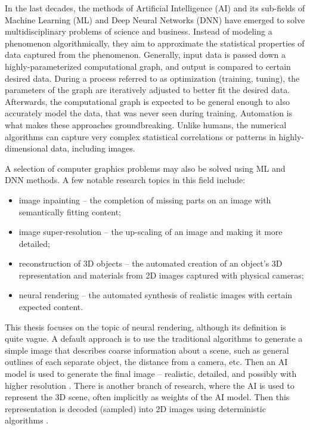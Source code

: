 In the last decades, the methods of Artificial Intelligence (AI) and its sub-fields of Machine Learning (ML) and Deep Neural Networks (DNN) have emerged to solve multidisciplinary problems of science and business. Instead of modeling a phenomenon algorithmically, they aim to approximate the statistical properties of data captured from the phenomenon. Generally, input data is passed down a highly-parameterized computational graph, and output is compared to certain desired data. During a process referred to as optimization (training, tuning), the parameters of the graph are iteratively adjusted to better fit the desired data. Afterwards, the computational graph is expected to be general enough to also accurately model the data, that was never seen during training. Automation is what makes these approaches groundbreaking. Unlike humans, the numerical algorithms can capture very complex statistical correlations or patterns in highly-dimensional data, including images.

A selection of computer graphics problems may also be solved using ML and DNN methods. A few notable research topics in this field include:
\begin{itemize}
\item image inpainting -- the completion of missing parts on an image with semantically fitting content;
\item image super-resolution -- the up-scaling of an image and making it more detailed;
\item reconstruction of 3D objects -- the automated creation of an object's 3D representation and materials from 2D images captured with physical cameras;
\item neural rendering -- the automated synthesis of realistic images with certain expected content.
\end{itemize}

This thesis focuses on the topic of neural rendering, although its definition is quite vague. A default approach is to use the traditional algorithms to generate a simple image that describes coarse information about a scene, such as general outlines of each separate object, the distance from a camera, etc. Then an AI model is used to generate the final image -- realistic, detailed, and possibly with higher resolution \cite{dnn:deferred19}. There is another branch of research, where the AI is used to represent the 3D scene, often implicitly as weights of the AI model. Then this representation is decoded (sampled) into 2D images using deterministic algorithms \cite{dnn:nerf20}.
 
